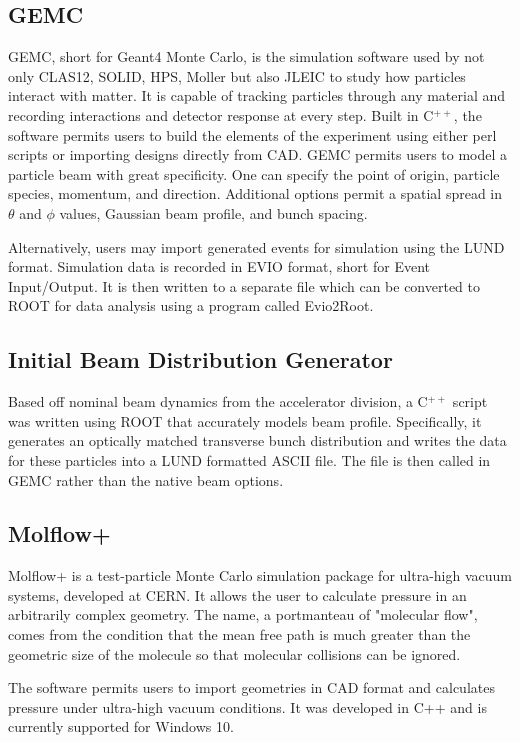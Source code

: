 \subsection{GEMC}

GEMC, short for Geant4 Monte Carlo, is the simulation software used by not only CLAS12, SOLID, HPS, Moller but also JLEIC to study how particles interact with matter.  It is capable of tracking particles through any material and recording interactions and detector response at every step.  Built in C$^{++}$, the software permits users to build the elements of the experiment using either perl scripts or importing designs directly from CAD.  GEMC permits users to model a particle beam with great specificity.  One can specify the point of origin, particle species, momentum, and direction.  Additional options permit a spatial spread in $\theta$ and $\phi$ values, Gaussian beam profile, and bunch spacing. 

Alternatively, users may import generated events for simulation using the LUND format.  Simulation data is recorded in EVIO format, short for Event Input/Output.  It is then written to a separate file which can be converted to ROOT for data analysis using a program called Evio2Root\cite{Ungaro}.

\subsection{Initial Beam Distribution Generator}
Based off nominal beam dynamics from the accelerator division, a C$^{++}$ script was written using ROOT that accurately models beam profile.  Specifically, it generates an optically matched transverse bunch distribution and writes the data for these particles into a LUND formatted ASCII file.  The file is then called in GEMC rather than the native beam options.  
  

\subsection{Molflow+}

Molflow+ is a test-particle Monte Carlo simulation package for ultra-high vacuum systems, developed at CERN.  It allows the user to calculate pressure in an arbitrarily complex geometry.  The name, a portmanteau of "molecular flow", comes from the condition that the mean free path is much greater than the geometric size of the molecule so that molecular collisions can be ignored.

The software permits users to import geometries in CAD format and calculates pressure under ultra-high vacuum conditions. It was developed in C++ and is currently supported for Windows 10.

